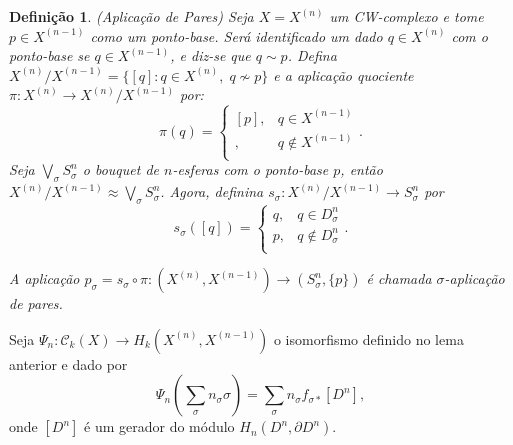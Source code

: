 \documentclass[12pt]{book}
\newtheorem{definicao}[teorema]{Definição}
\newcommand{\celula}[2]{D^{#1}_{#2}}
\newcommand{\classe}[1]{[#1]}
\newcommand{\funcaocond}[5]{
	#1 = 
	\left\{
	\begin{array}{cc}
		#2, & #3\\
		#4, & #5\\
	\end{array}
	\right.
}
\newcommand{\homologiarelcel}[3]{H_{#1}(D^{#2}_{#3}, \partial D^{#2}_{#3})}
\newcommand{\homologiarelskelesimpl}[2]{H_{#1}(X^{(#2)}, X^{(#2-1)})}
\newcommand{\skeleton}[1]{X^{(#1)}}
\begin{document}
	\begin{definicao}
		(Aplicação de Pares) Seja $X = \skeleton{n}$ um CW-complexo e tome $p \in \skeleton{n-1}$ como um ponto-base. Será identificado um dado $q \in \skeleton{n}$ com o ponto-base se $q \in \skeleton{n-1}$, e diz-se que $q \sim p$. Defina $\skeleton{n}/\skeleton{n-1} = \{[q]: q \in \skeleton{n}, \; q \nsim p\}$ e a aplicação quociente $\pi : \skeleton{n} \to \skeleton{n}/\skeleton{n-1}$ por:
		$$
		\pi(q) = 
		\left\{
		\begin{array}{cc}
		\classe{p}, & q \in \skeleton{n-1}\\
		\classe{q}, & q \notin \skeleton{n-1}\\
		\end{array}
		\right..
		$$
		Seja $\bigvee_{\sigma} S^{n}_{\sigma}$ o bouquet de $n$-esferas com o ponto-base $p$, então $\skeleton{n}/\skeleton{n-1} \approx \bigvee_{\sigma} S^{n}_{\sigma}$. Agora, definina $s_{\sigma} : \skeleton{n}/\skeleton{n-1} \to S^{n}_{\sigma}$ por 
		$$
		\funcaocond{s_{\sigma}([q])}{q}{q \in \celula{n}{\sigma}}{p}{q \notin \celula{n}{\sigma}}.
		$$
		
		A aplicação $p_{\sigma} = s_{\sigma} \circ \pi : (\skeleton{n}, \skeleton{n-1}) \to (S^{n}_{\sigma}, \{p\})$ é chamada $\sigma$-aplicação de pares.
	\end{definicao}
	
	Seja $\Psi_{n}:\mathcal{C}_{k}(X) \to \homologiarelskelesimpl{k}{n}$ o isomorfismo definido no lema anterior e dado por 
	$$
	\Psi_{n}(\sum_{\sigma} n_{\sigma} \sigma) = \sum_{\sigma} n_{\sigma} f_{\sigma *}[D^{n}],
	$$
	onde $[D^{n}]$ é um gerador do módulo $\homologiarelcel{n}{n}{}$.
	
\end{document}

